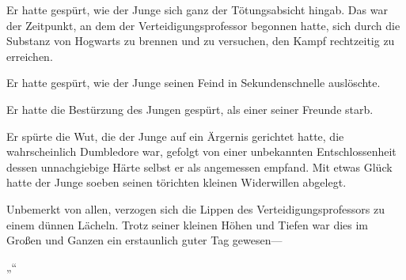 Er hatte gespürt, wie der Junge sich ganz der Tötungsabsicht hingab. Das war der Zeitpunkt, an dem der Verteidigungsprofessor begonnen hatte, sich durch die Substanz von Hogwarts zu brennen und zu versuchen, den Kampf rechtzeitig zu erreichen.

Er hatte gespürt, wie der Junge seinen Feind in Sekundenschnelle auslöschte.

Er hatte die Bestürzung des Jungen gespürt, als einer seiner Freunde starb.

Er spürte die Wut, die der Junge auf ein Ärgernis gerichtet hatte, die wahrscheinlich Dumbledore war, gefolgt von einer unbekannten Entschlossenheit dessen unnachgiebige Härte selbst er als angemessen empfand. Mit etwas Glück hatte der Junge soeben seinen törichten kleinen Widerwillen abgelegt.

Unbemerkt von allen, verzogen sich die Lippen des Verteidigungsprofessors zu einem dünnen Lächeln. Trotz seiner kleinen Höhen und Tiefen war dies im Großen und Ganzen ein erstaunlich guter Tag gewesen—

„“


